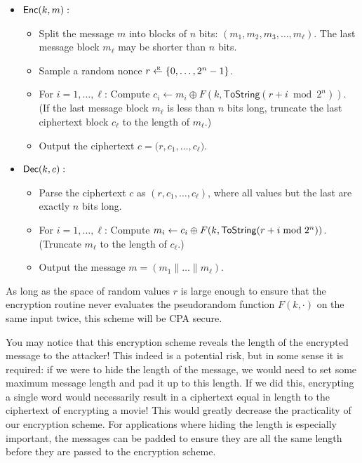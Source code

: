 \begin{itemize}
  \item $\mathsf{Enc}(k, m):$
    \begin{itemize}
      \item Split the message $m$ into blocks of $n$ bits: $(m_1, m_2, m_3, \dots, m_\ell)$.
            The last message block $m_\ell$ may be shorter than $n$ bits.
      \item Sample a random nonce 
            $r \getsr \{0, \dots, 2^n-1\}$.
      \item For $i = 1, \dots, \ell$: Compute $c_i \gets m_i \oplus F(k, \mathsf{ToString}(r+i \bmod 2^n))$.\\
            (If the last message block $m_\ell$ is less than $n$ bits long, 
            truncate the last ciphertext block $c_\ell$ to the length of $m_\ell$.)
      \item Output the ciphertext $c = \big(r, c_1, \dots, c_\ell)$.
    \end{itemize}

  \item $\mathsf{Dec}(k, c):$
    \begin{itemize}
      \item Parse the ciphertext $c$ as $(r, c_1, \dots, c_\ell)$,
            where all values but the last are exactly $n$ bits long.
          \item For $i = 1, \dots, \ell$: Compute $m_i \gets c_i \oplus F(k, \mathsf{ToString}(r+i \bmod 2^n))$.
            (Truncate $m_\ell$ to the length of $c_\ell$.)
      \item Output the message $m = (m_1 \| \dots \| m_\ell)$.
    \end{itemize}

\end{itemize}

As long as the space of random values $r$ is large enough to ensure that
the encryption routine never evaluates the pseudorandom function $F(k, \cdot)$
on the same input twice, this scheme will be CPA secure.

You may notice that this encryption scheme reveals
the length of the encrypted message to the attacker! This
indeed is a potential risk, but in some sense it
is required: if we were to hide the length of the
message, we would need to set some maximum message
length and pad it up to this length. If we did
this, encrypting a single word would necessarily
result in a ciphertext equal in length to the
ciphertext of encrypting a movie! This would
greatly decrease the practicality of our
encryption scheme. For applications where hiding
the length is especially important, the messages
can be padded to ensure they are all the same
length before they are passed to the encryption
scheme.

